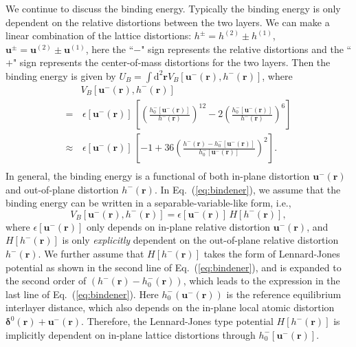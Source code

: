 \documentclass[aps,prx,10pt,twocolumn,superscriptaddress]{revtex4}
\begin{document}
We continue to discuss the binding energy.
Typically the binding energy is only dependent on the  relative distortions between the two layers. We can  make a linear combination of the lattice distortions: $h^{\pm}=h^{(2)}\pm h^{(1)}$, $\textbf{u}^{\pm}=\textbf{u}^{(2)}\pm \textbf{u}^{(1)}$, here the ``$-$" sign represents the relative distortions and the ``$+$" sign represents the center-of-mass distortions for the two layers. Then the binding energy is given by $U_{B}\!=\!\int\mathrm{d}^{2}\textbf{r} V_{B}[\bm{u}^{-}(\mathbf{r}),h^{-}(\mathbf{r})]$, where
\begin{equation}\label{eq:bindener}
\begin{split}
&V_{B}[\bm{u}^{-}(\mathbf{r}),h^{-}(\mathbf{r})]\\
=&\,\epsilon[\bm{u}^{-}(\mathbf{r})]\,\left[ \left( \frac{h^{-}_{0}[\bm{u}^{-}(\textbf{r})]}{h^{-}(\textbf{r})} \right)^{12} - 2\left( \frac{h^{-}_{0}[\bm{u}^{-}(\textbf{r})]}{h^{-}(\textbf{r})} \right)^{6} \right]  \\
\approx&\,\epsilon[\bm{u}^{-}(\textbf{r})]\,\left[ -1+36\left(\frac{h^{-}(\textbf{r})-h^{-}_{0}[\bm{u}^{-}(\textbf{r})]}{h^{-}_{0}[\bm{u}^{-}(\textbf{r})]}\right)^{2} \right]. \\
\end{split}
\end{equation}
In general, the binding energy is a functional of both in-plane distortion $\mathbf{u}^{-}(\mathbf{r})$ and out-of-plane distortion $h^{-}(\mathbf{r})$. In Eq.~(\ref{eq:bindener}), we assume that the binding energy can be written in a separable-variable-like form, i.e., 
\begin{equation}
V_{B}[\bm{u}^{-}(\mathbf{r}),h^{-}(\mathbf{r})]=\epsilon[\bm{u}^{-}(\textbf{r})]\,H[h^{-}(\mathbf{r})],  
\label{eq:bind}
\end{equation}
where $\epsilon[\bm{u}^{-}(\textbf{r})]$ only depends on in-plane relative distortion $\bm{u}^{-}(\textbf{r})$, and $H[h^{-}(\mathbf{r})]$ is only \textit{explicitly} dependent on the out-of-plane relative distortion $h^{-}(\mathbf{r})$. We further assume that $H[h^{-}(\mathbf{r})]$ takes the form of Lennard-Jones potential as shown in the second line of Eq.~(\ref{eq:bindener}), and is expanded to the second order of $(h^{-}(\mathbf{r})-h^{-}_0(\mathbf{r}))$, which leads to the expression in the last line of  Eq.~(\ref{eq:bindener}). Here $h^{-}_{0}(\bm{u}^{-}(\textbf{r}))$ is the reference equilibrium interlayer distance, which also depends on the in-plane local atomic distortion $\bm{\delta}^{0}(\mathbf{r})+\mathbf{u}^{-}(\mathbf{r})$. Therefore, the Lennard-Jones type potential $H[h^{-}(\mathbf{r})]$ is  implicitly dependent on in-plane lattice distortions through $h^{-}_{0}[\bm{u}^{-}(\textbf{r})]$. 
\end{document}
